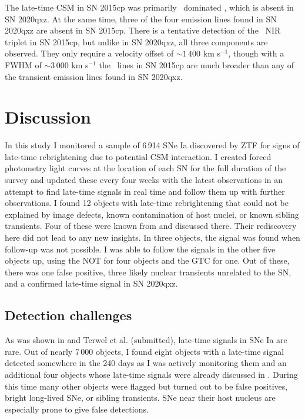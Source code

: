 \documentclass[a4paper,oneside,12pt, class=Latex/Classes/PhDthesisPSnPDF, crop=false]{standalone}
\begin{document}
The late-time CSM in SN 2015cp was primarily \Halpha\ dominated \citep{2015cp}, which is absent in SN 2020qxz. At the same time, three of the four emission lines found in SN 2020qxz are absent in SN 2015cp. There is a tentative detection of the \CaII\ NIR triplet in SN 2015cp, but unlike in SN 2020qxz, all three components are observed. They only require a velocity offset of $\sim1\,400$ km s$^{-1}$, though with a FWHM of $\sim3\,000$ km s$^{-1}$ the \CaII\ lines in SN 2015cp are much broader than any of the transient emission lines found in SN 2020qxz.


\section{Discussion}
\label{discussion}
In this study I monitored a sample of 6\,914 SNe Ia discovered by ZTF for signs of late-time rebrightening due to potential CSM interaction. I created forced photometry light curves at the location of each SN for the full duration of the survey and updated these every four weeks with the latest observations in an attempt to find late-time signals in real time and follow them up with further observations. I found 12 objects with late-time rebrightening that could not be explained by image defects, known contamination of host nuclei, or known sibling transients. Four of these were known from \citet{Terwel_2024_paper1} and discussed there. Their rediscovery here did not lead to any new insights. In three objects, the signal was found when follow-up was not possible. I was able to follow the signals in the other five objects up, using the NOT for four objects and the GTC for one. Out of these, there was one false positive, three likely nuclear transients unrelated to the SN, and a confirmed late-time signal in SN 2020qxz.


\subsection{Detection challenges}
As was shown in \citet{Terwel_2024_paper1} and Terwel et al. (submitted), late-time signals in SNe Ia are rare. Out of nearly 7\,000 objects, I found eight objects with a late-time signal detected somewhere in the 240 days as I was actively monitoring them and an additional four objects whose late-time signals were already discussed in \citet{Terwel_2024_paper1}. During this time many other objects were flagged but turned out to be false positives, bright long-lived SNe, or sibling transients. SNe near their host nucleus are especially prone to give false detections.
\end{document}
